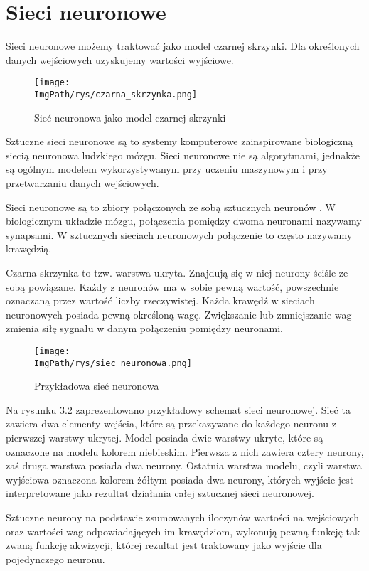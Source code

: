 \documentclass[a4paper,12pt,twoside,openany]{report}
\newcommand{\ImgPath}{.}
\begin{document}
\section{Sieci neuronowe}
Sieci neuronowe możemy traktować jako model czarnej skrzynki. Dla określonych danych wejściowych uzyskujemy wartości wyjściowe.

\begin{figure}[H]	
	\centering
	\texttt{[image: \\ImgPath/rys/czarna\_skrzynka.png]}
	
	\caption{Sieć neuronowa jako model czarnej skrzynki}
\end{figure}

Sztuczne sieci neuronowe są to systemy komputerowe zainspirowane biologiczną siecią neuronowa ludzkiego mózgu. Sieci neuronowe nie są algorytmami, jednakże są ogólnym modelem wykorzystywanym przy uczeniu maszynowym i przy przetwarzaniu danych wejściowych.

Sieci neuronowe są to zbiory połączonych ze sobą sztucznych neuronów \cite{Osowski}. W biologicznym układzie mózgu, połączenia pomiędzy dwoma neuronami nazywamy synapsami. W sztucznych sieciach neuronowych połączenie to często nazywamy krawędzią. 

Czarna skrzynka to tzw. warstwa ukryta. Znajdują się w niej neurony ściśle ze sobą powiązane. Każdy z neuronów ma w sobie pewną wartość, powszechnie oznaczaną przez wartość liczby rzeczywistej. Każda krawędź w sieciach neuronowych posiada pewną określoną wagę. Zwiększanie lub zmniejszanie wag zmienia siłę sygnału w danym połączeniu pomiędzy neuronami.

\begin{figure}[H]	
	\centering
	\texttt{[image: \\ImgPath/rys/siec\_neuronowa.png]}
	
	\caption{Przykładowa sieć neuronowa}
\end{figure}

Na rysunku 3.2 zaprezentowano przykładowy schemat sieci neuronowej. Sieć ta zawiera dwa elementy wejścia, które są przekazywane do każdego neuronu z pierwszej warstwy ukrytej. Model posiada dwie warstwy ukryte, które są oznaczone na modelu kolorem niebieskim. Pierwsza z nich zawiera cztery neurony, zaś druga warstwa posiada dwa neurony. Ostatnia warstwa modelu, czyli warstwa wyjściowa oznaczona kolorem żółtym posiada dwa neurony, których wyjście jest interpretowane jako rezultat działania całej sztucznej sieci neuronowej.

Sztuczne neurony na podstawie zsumowanych iloczynów wartości na wejściowych oraz wartości wag odpowiadających im krawędziom, wykonują pewną funkcję tak zwaną funkcję akwizycji, której rezultat jest traktowany jako wyjście dla pojedynczego neuronu. 
\end{document}
